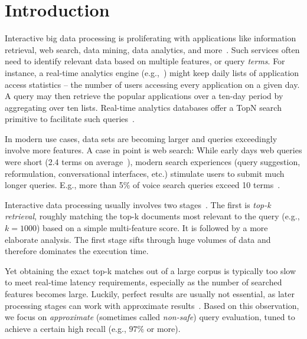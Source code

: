 \section{Introduction}
\label{sec:intro}

Interactive big data processing is proliferating with  applications like
information retrieval, web search, data mining, data analytics, and more~\cite{top-k-survey}. 
Such services often need to identify relevant data based on multiple {features}, or query \emph{terms}.  
For instance, a real-time analytics engine (e.g.,~\cite{flurry}) might keep daily lists of application access statistics -- the 
number of  users accessing every application on a given day.  
A query may then retrieve the popular applications over a  ten-day period by aggregating over ten lists.
Real-time analytics databases offer a TopN search primitive to facilitate such queries~\cite{druid-topN}.

In modern use cases,  data sets are becoming larger and queries exceedingly  involve more features. 
A case in point is web search:  
While  early days web queries were short (2.4 terms on average~\cite{Spink:2001:SWP:362968.362979}), 
modern search experiences (query suggestion, reformulation, conversational interfaces, etc.) stimulate  users to submit much longer queries. 
E.g., more than 5\% of voice search queries exceed 10 terms~\cite{sigir/Guy16}. 

Interactive data processing   usually involves two stages~\cite{Wang:2011}. 
The first  is \emph{top-k retrieval}, roughly matching the top-k documents most relevant to the query
(e.g., $k=1000$) based on a simple multi-feature  score. 
It is followed by a more elaborate analysis. 
The first stage  sifts through huge volumes of data and therefore dominates the execution time. 

Yet obtaining the exact top-k matches out of a large corpus is typically too slow to meet real-time latency requirements, 
especially as the number of searched features becomes large.
Luckily, 
perfect results are usually not essential, as later  processing 
stages can work with approximate results~\cite{Crane:2017,Lin:2015,Wang:2011,druid-topN}. 
Based on this observation, we focus on \emph{approximate} 
(sometimes called \emph{non-safe}) query evaluation, tuned to achieve a certain high recall (e.g., $97\%$ or more). 


